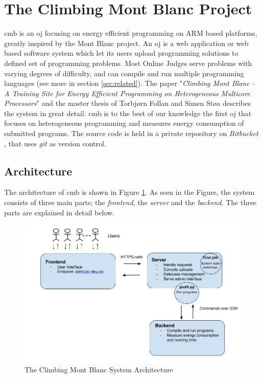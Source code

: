 \section{The Climbing Mont Blanc Project}
\label{sec:cmb}
\gls{cmb} is an \gls{oj} focusing on energy efficient programming on ARM based platforms, greatly inspired by the Mont Blanc project. An \gls{oj} is a web application or web based software system which let its users upload programming solutions to defined set of programming problems. Most Online Judges serve problems with varying degrees of difficulty, and can compile and run multiple programming languages (see more in section \ref{sec:related}). The paper "\textit{Climbing Mont Blanc - A Training Site for Energy Efficient Programming on Heterogeneous Multicore Processors}" \cite{a:CMB} and the master thesis of Torbjørn Follan and Simen Støa \cite{mt:T&S} describes the system in great detail. \gls{cmb} is to the best of our knowledge the first \gls{oj} that focuses on heterogeneous programming and measures energy consumption of submitted programs. The source code is held in a private repository on \textit{Bitbucket} \cite{BITBUCKET}, that uses \textit{git} \cite{GIT} as version control.

\subsection{Architecture}
\label{subsec:cmb-arch}
The architecture of \gls{cmb} is shown in Figure \ref{fig:cmb_arch}. As seen in the Figure, the system consists of three main parts; the \textit{frontend}, the \textit{server} and the \textit{backend}. The three parts are explained in detail below.

\begin{figure}
  \includegraphics[width=1.0\textwidth]{figs/cmb_arch.jpg}
  \caption[The Climbing Mont Blanc System Architecture]{The Climbing Mont Blanc System Architecture}
  \label{fig:cmb_arch}
\end{figure}

